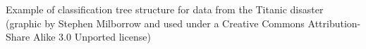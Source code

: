 Example of classification tree structure for data from the Titanic disaster (graphic by Stephen Milborrow and used under a Creative Commons Attribution-Share Alike 3.0 Unported license)
\label{fig:decisiontree}